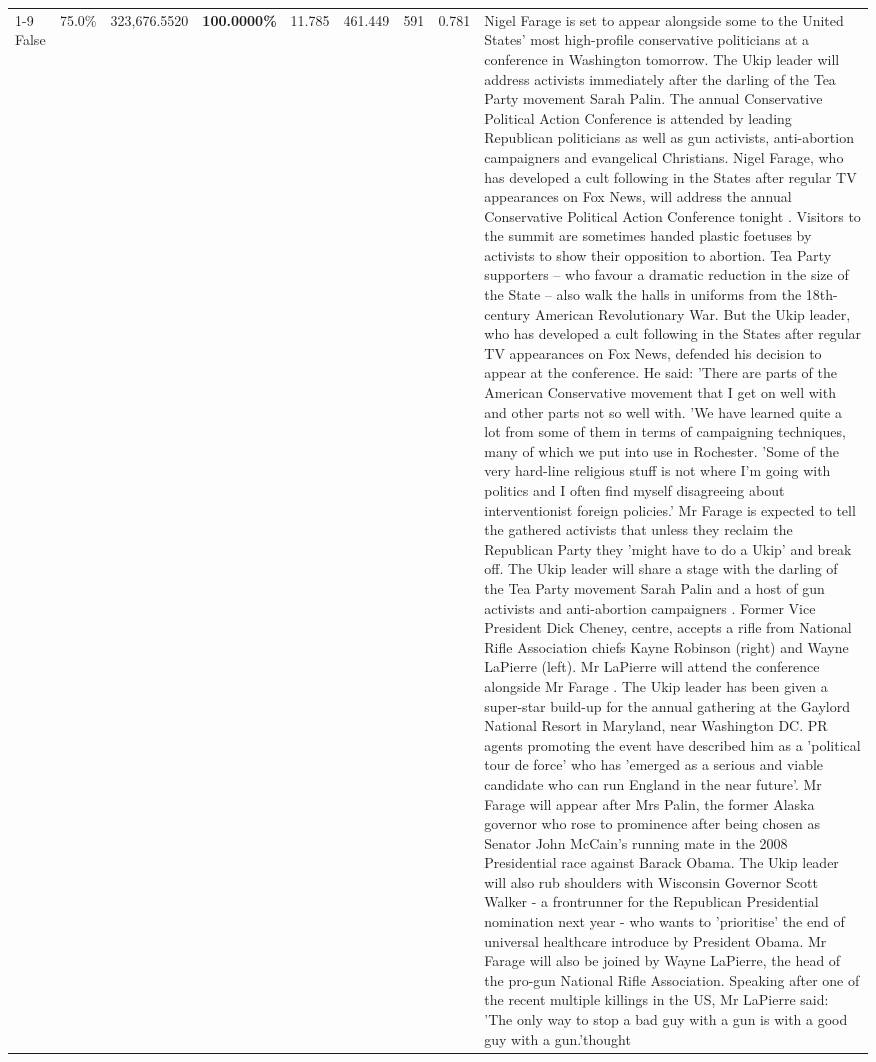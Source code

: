 \begin{table}[H]
\begin{tabular}{lllrlllll}
\cline{1-9}
False & 75.0\% & 323,676.5520 & \bfseries \color{red} 100.0000\% & 11.785 & 461.449 & 591 & 0.781 & Nigel Farage is set to appear alongside some to the United States' most high-profile conservative politicians at a conference in Washington tomorrow. The Ukip leader will address activists immediately after the darling of the Tea Party movement Sarah Palin. The annual Conservative Political Action Conference is attended by leading Republican politicians as well as gun activists, anti-abortion campaigners and evangelical Christians. Nigel Farage, who has developed a cult following in the States after regular TV appearances on Fox News, will address the annual Conservative Political Action Conference tonight . Visitors to the summit are sometimes handed plastic foetuses by activists to show their opposition to abortion. Tea Party supporters – who favour a dramatic reduction in the size of the State – also walk the halls in uniforms from the 18th-century American Revolutionary War. But the Ukip leader, who has developed a cult following in the States after regular TV appearances on Fox News, defended his decision to appear at the conference. He said: 'There are parts of the American Conservative movement that I get on well with and other parts not so well with. 'We have learned quite a lot from some of them in terms of campaigning techniques, many of which we put into use in Rochester. 'Some of the very hard-line religious stuff is not where I'm going with politics and I often find myself disagreeing about interventionist foreign policies.' Mr Farage is expected to tell the gathered activists that unless they reclaim the Republican Party they 'might have to do a Ukip' and break off. The Ukip leader will share a stage with the darling of the Tea Party movement Sarah Palin and a host of gun activists and anti-abortion campaigners . Former Vice President Dick Cheney, centre, accepts a rifle from National Rifle Association chiefs Kayne Robinson (right) and Wayne LaPierre (left). Mr LaPierre will attend the conference alongside Mr Farage . The Ukip leader has been given a super-star build-up for the annual gathering at the Gaylord National Resort in Maryland, near Washington DC. PR agents promoting the event have described him as a 'political tour de force' who has 'emerged as a serious and viable candidate who can run England in the near future'. Mr Farage will appear after Mrs Palin, the former Alaska governor who rose to prominence after being chosen as Senator John McCain's running mate in the 2008 Presidential race against Barack Obama. The Ukip leader will also rub shoulders with Wisconsin Governor Scott Walker - a frontrunner for the Republican Presidential nomination next year - who wants to 'prioritise' the end of universal healthcare introduce by President Obama. Mr Farage will also be joined by Wayne LaPierre, the head of the pro-gun National Rifle Association. Speaking after one of the recent multiple killings in the US, Mr LaPierre said: 'The only way to stop a bad guy with a gun is with a good guy with a gun.'thought \\

\end{tabular}
\end{table}
